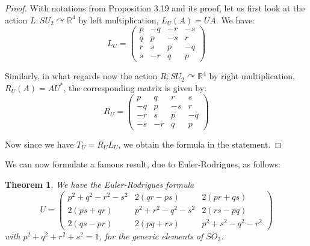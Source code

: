 \documentclass[12pt]{amsbook}
\newtheorem{theorem}{Theorem}[chapter]
\begin{document}
\begin{proof}
With notations from Proposition 3.19 and its proof, let us first look at the action $L:SU_2\curvearrowright\mathbb R^4$ by left multiplication, $L_U(A)=UA$. We have:
$$L_U=\begin{pmatrix}
p&-q&-r&-s\\
q&p&-s&r\\
r&s&p&-q\\
s&-r&q&p
\end{pmatrix}$$

Similarly, in what regards now the action $R:SU_2\curvearrowright\mathbb R^4$ by right multiplication, $R_U(A)=AU^*$, the corresponding matrix is given by:
$$R_U=\begin{pmatrix}
p&q&r&s\\
-q&p&-s&r\\
-r&s&p&-q\\
-s&-r&q&p
\end{pmatrix}$$

Now since we have $T_U=R_UL_U$, we obtain the formula in the statement.
\end{proof}

We can now formulate a famous result, due to Euler-Rodrigues, as follows:


\begin{theorem}
We have the Euler-Rodrigues formula
$$U=\begin{pmatrix}
p^2+q^2-r^2-s^2&2(qr-ps)&2(pr+qs)\\
2(ps+qr)&p^2+r^2-q^2-s^2&2(rs-pq)\\
2(qs-pr)&2(pq+rs)&p^2+s^2-q^2-r^2
\end{pmatrix}$$
with $p^2+q^2+r^2+s^2=1$, for the generic elements of $SO_3$.
\end{theorem}
\end{document}
